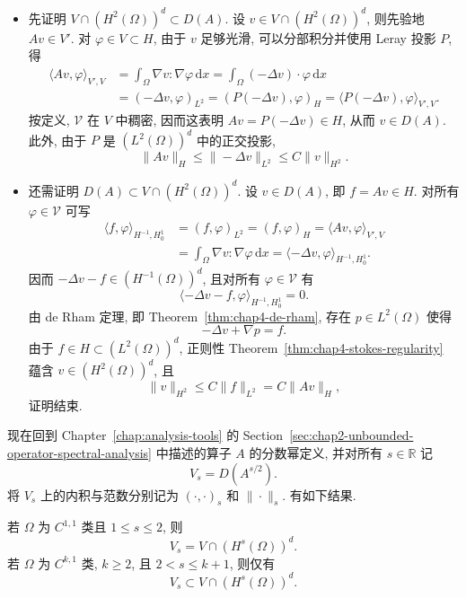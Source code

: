 \begin{Proof}
\begin{itemize}
 \item 先证明 $V\cap(H^2(\Omega))^d\subset D(A)$. 设 $v\in V\cap(H^2(\Omega))^d$, 则先验地 $Av\in V'$. 对 $\varphi\in V\subset H$, 由于 $v$ 足够光滑, 可以分部积分并使用 Leray 投影 $P$, 得
 \[
  \begin{aligned}
  \langle Av,\varphi\rangle_{V',V}
  &=\int_\Omega\nabla v:\nabla\varphi\,\mathrm dx
   =\int_\Omega(-\Delta v)\cdot\varphi\,\mathrm dx\\
  &=(-\Delta v,\varphi)_{L^2}
   =(P(-\Delta v),\varphi)_H
   =\langle P(-\Delta v),\varphi\rangle_{V',V}.
  \end{aligned}
 \]
 按定义, $\mathcal V$ 在 $V$ 中稠密, 因而这表明 $Av=P(-\Delta v)\in H$, 从而 $v\in D(A)$. 此外, 由于 $P$ 是 $(L^2(\Omega))^d$ 中的正交投影,
 \[
  \|Av\|_H\leq\|-\Delta v\|_{L^2}\leq C\|v\|_{H^2}.
 \]

 \item 还需证明 $D(A)\subset V\cap(H^2(\Omega))^d$. 设 $v\in D(A)$, 即 $f=Av\in H$. 对所有 $\varphi\in\mathcal V$ 可写
 \[
  \begin{aligned}
  \langle f,\varphi\rangle_{H^{-1},H_0^1}
  &=(f,\varphi)_{L^2}=(f,\varphi)_H
   =\langle Av,\varphi\rangle_{V',V}\\
  &=\int_\Omega\nabla v:\nabla\varphi\,\mathrm dx
   =\langle-\Delta v,\varphi\rangle_{H^{-1},H_0^1}.
  \end{aligned}
 \]
 因而 $-\Delta v-f\in(H^{-1}(\Omega))^d$, 且对所有 $\varphi\in\mathcal V$ 有
 \[
  \langle-\Delta v-f,\varphi\rangle_{H^{-1},H_0^1}=0.
 \]
 由 de Rham 定理, 即 Theorem~\ref{thm:chap4-de-rham}, 存在 $p\in L^2(\Omega)$ 使得
 \[
  -\Delta v+\nabla p=f.
 \]
 由于 $f\in H\subset(L^2(\Omega))^d$, 正则性 Theorem~\ref{thm:chap4-stokes-regularity} 蕴含 $v\in(H^2(\Omega))^d$, 且
 \[
  \|v\|_{H^2}\leq C\|f\|_{L^2}=C\|Av\|_H,
 \]
 证明结束.
\end{itemize}
\end{Proof}

现在回到 Chapter~\ref{chap:analysis-tools} 的 Section~\ref{sec:chap2-unbounded-operator-spectral-analysis} 中描述的算子 $A$ 的分数幂定义, 并对所有 $s\in\mathbb R$ 记
\[
 V_s=D(A^{s/2}).
\]
将 $V_s$ 上的内积与范数分别记为 $(\cdot,\cdot)_s$ 和 $\|\cdot\|_s$. 有如下结果.

\begin{Proposition}
\label{prop:chap4-stokes-fractional-domains}
若 $\Omega$ 为 $C^{1,1}$ 类且 $1\leq s\leq2$, 则
\[
 V_s=V\cap(H^s(\Omega))^d.
\]
若 $\Omega$ 为 $C^{k,1}$ 类, $k\geq2$, 且 $2<s\leq k+1$, 则仅有
\[
 V_s\subset V\cap(H^s(\Omega))^d.
\]
\end{Proposition}

